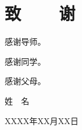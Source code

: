\renewcommand{\baselinestretch}{1.5}
\fontsize{12pt}{13pt}\selectfont

\chapter*{致~~~~谢}

感谢导师。

感谢同学。

感谢父母。

\begin{flushright}
姓~~名\qquad{}
\par\end{flushright}

\begin{flushright}
XXXX年XX月XX日
\par\end{flushright}
